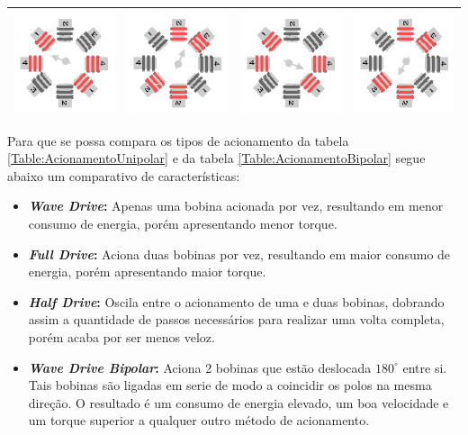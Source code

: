 \begin{table}[H]
\begin{tabular}{|cccc|}
		\includegraphics[width = 0.15\columnwidth]{Images/AcionamentoDoHSM/Bipolar/FullDrive/FullDriveI.png} & \includegraphics[width = 0.15\columnwidth]{Images/AcionamentoDoHSM/Bipolar/FullDrive/FullDriveII.png} & \includegraphics[width = 0.15\columnwidth]{Images/AcionamentoDoHSM/Bipolar/FullDrive/FullDriveIII.png} & \includegraphics[width = 0.15\columnwidth]{Images/AcionamentoDoHSM/Bipolar/FullDrive/FullDriveIV.png} \\
		\hline
	\end{tabular}
\end{table} 

Para que se possa compara os tipos de acionamento da tabela \ref{Table:AcionamentoUnipolar} e da tabela \ref{Table:AcionamentoBipolar} segue abaixo um comparativo de características:
\begin{itemize}
	\item \textbf{\textit{Wave Drive}:} Apenas uma bobina acionada por vez, resultando em  menor consumo de energia, porém apresentando menor torque.
	\item \textbf{\textit{Full Drive}:} Aciona duas bobinas por vez, resultando em  maior consumo de energia, porém apresentando maior torque.
	\item \textbf{\textit{Half Drive}:} Oscila entre o acionamento de uma e duas bobinas, dobrando assim a  quantidade de passos necessários para realizar uma volta completa, porém acaba por ser menos veloz.
	\item \textbf{\textit{Wave Drive Bipolar}:} Aciona 2 bobinas que estão deslocada $180^{\circ}$ entre si. Tais bobinas são ligadas em serie de modo a coincidir os polos na mesma direção. O resultado é um consumo de energia elevado, um boa velocidade e um torque superior a qualquer outro método de acionamento.
\end{itemize}
